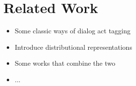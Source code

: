 \section{Related Work}\label{sec:relwork}
\begin{itemize}
	\item Some classic ways of dialog act tagging
	\item Introduce distributional representations
	\item Some works that combine the two
	\item ...
\end{itemize}